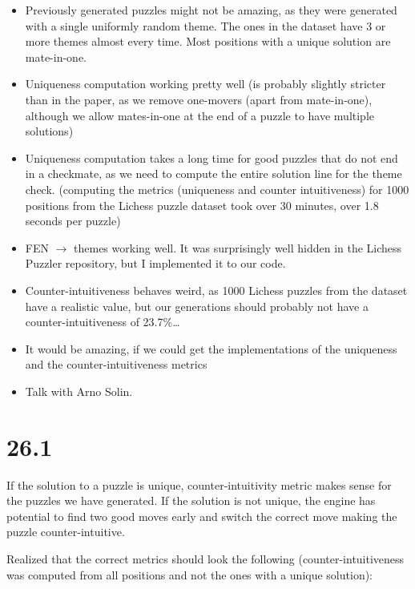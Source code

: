 \documentclass[a4paper, 12pt]{article}
\begin{document}
\begin{itemize}
    \item Previously generated puzzles might not be amazing, as they were generated with a single uniformly random theme. The ones in the dataset have 3 or more themes almost every time. Most positions with a unique solution are mate-in-one.
    \item Uniqueness computation working pretty well (is probably slightly stricter than in the paper, as we remove one-movers (apart from mate-in-one), although we allow mates-in-one at the end of a puzzle to have multiple solutions)
    \item Uniqueness computation takes a long time for good puzzles that do not end in a checkmate, as we need to compute the entire solution line for the theme check. (computing the metrics (uniqueness and counter intuitiveness) for 1000 positions from the Lichess puzzle dataset took over 30 minutes, over 1.8 seconds per puzzle)
    \item FEN $\rightarrow$ themes working well. It was surprisingly well hidden in the Lichess Puzzler repository, but I implemented it to our code.
    \item Counter-intuitiveness behaves weird, as 1000 Lichess puzzles from the dataset have a realistic value, but our generations should probably not have a counter-intuitiveness of 23.7\%\dots
    \item It would be amazing, if we could get the implementations of the uniqueness and the counter-intuitiveness metrics 
    \item Talk with Arno Solin.
\end{itemize}

\section{26.1}

If the solution to a puzzle is unique, counter-intuitivity metric makes sense for the puzzles we have generated. If the solution is not unique, the engine has potential to find two good moves early and switch the correct move making the puzzle counter-intuitive.

Realized that the correct metrics should look the following (counter-intuitiveness was computed from all positions and not the ones with a unique solution):
\end{document}
